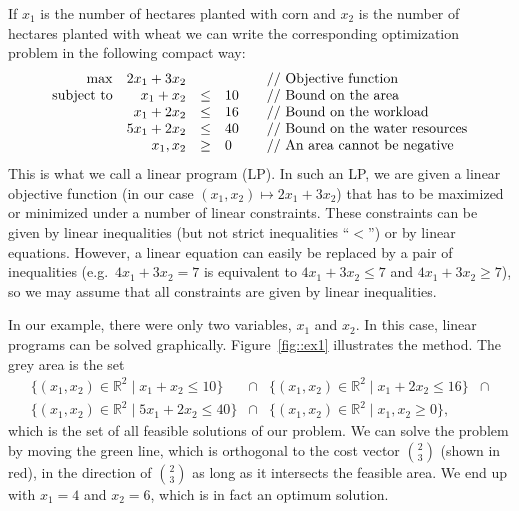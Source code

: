 \documentclass[12pt, showidx, twoside]{article}
\def\R{\mathbb{R}}
\begin{document}
If $x_1$ is the number of hectares planted with corn and $x_2$ is the
number of hectares planted with wheat we can write the corresponding optimization
problem in the following compact way:
  \begin{equation*}
  \begin{array}{rrcll}
    \max &  2x_1 + 3x_2 & &                         & \mbox{\quad // Objective function} \\
    \text{subject to} &  x_1 + x_2 & \le & 10       & \mbox{\quad // Bound on the area}\\
       &  x_1 + 2x_2  & \le & 16                    & \mbox{\quad // Bound on the workload} \\
       &  5x_1 + 2x_2 & \le & 40                    & \mbox{\quad // Bound on the water resources}\\
       &   x_1,x_2    & \ge & 0                     & \mbox{\quad // An area cannot be negative}  
\end{array}
  \end{equation*}
This is what we call a linear program (LP). In such an LP, we are given a linear
objective function (in our case $(x_1,x_2) \mapsto 2x_1 + 3x_2$) that has to be maximized
or minimized under a number of linear constraints. These constraints can be
given by linear inequalities (but not strict inequalities ``$<$'') or by linear
equations. However, a linear equation can easily be replaced by a pair of inequalities
(e.g.\ $4x_1 + 3x_2 = 7$ is equivalent to $4x_1 + 3x_2 \leq 7$ and $4x_1 + 3x_2 \geq 7$), so we
may assume that all constraints are given by linear inequalities.

In our example, there were only two variables, $x_1$ and $x_2$. In this case,
linear programs can be solved graphically. Figure~\ref{fig::ex1} illustrates
the method. The grey area is the set
\[
\begin{array}{llll}
   \{(x_1,x_2) \in \R^2 \mid x_1 + x_2 \le 10\} & \cap& 
   \{(x_1,x_2) \in \R^2 \mid x_1 + 2x_2 \le 16\} &  \cap\\
   \{(x_1,x_2) \in \R^2 \mid 5x_1 + 2x_2 \le 40  \} & \cap &
  \{(x_1,x_2) \in \R^2 \mid x_1, x_2 \ge 0  \},
\end{array}
\]
which is the set of all feasible solutions of our problem. We can solve the
problem by moving the green line, which is orthogonal to the 
cost vector ${2 \choose 3}$ (shown in red), in the direction of ${2 \choose 3}$ as long
as it intersects the feasible area. We end up with $x_1=4$ and $x_2=6$, which is
in fact an optimum solution.
\end{document}

